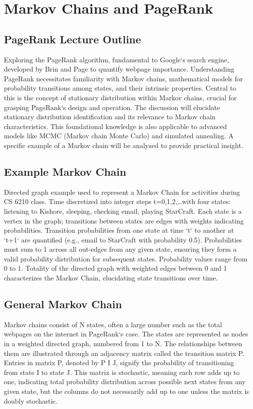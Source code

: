 \section*{Markov Chains and PageRank}

\subsection*{PageRank Lecture Outline}
Exploring the PageRank algorithm, fundamental to Google`s search engine, developed by Brin and Page to quantify webpage importance.
Understanding PageRank necessitates familiarity with Markov chains, mathematical models for probability transitions among states, and their intrinsic properties.
Central to this is the concept of stationary distribution within Markov chains, crucial for grasping PageRank`s design and operation.
The discussion will elucidate stationary distribution identification and its relevance to Markov chain characteristics.
This foundational knowledge is also applicable to advanced models like MCMC (Markov chain Monte Carlo) and simulated annealing.
A specific example of a Markov chain will be analyzed to provide practical insight.

\subsection*{Example  Markov Chain}
Directed graph example used to represent a Markov Chain for activities during CS 6210 class.
Time discretized into integer steps t=0,1,2,\ldots with four states: listening to Kishore, sleeping, checking email, playing StarCraft.
Each state is a vertex in the graph; transitions between states are edges with weights indicating probabilities.
Transition probabilities from one state at time `t` to another at `t+1` are quantified (e.g., email to StarCraft with probability 0.5).
Probabilities must sum to 1 across all out-edges from any given state, ensuring they form a valid probability distribution for subsequent states.
Probability values range from 0 to 1.
Totality of the directed graph with weighted edges between 0 and 1 characterizes the Markov Chain, elucidating state transitions over time.

\subsection*{General Markov Chain}
Markov chains consist of N states, often a large number such as the total webpages on the internet in PageRank`s case.
The states are represented as nodes in a weighted directed graph, numbered from 1 to N\@.
The relationships between them are illustrated through an adjacency matrix called the transition matrix P\@.
Entries in matrix P, denoted by P I J, signify the probability of transitioning from state I to state J\@.
This matrix is stochastic, meaning each row adds up to one, indicating total probability distribution across possible next states from any given state, but the columns do not necessarily add up to one unless the matrix is doubly stochastic.

